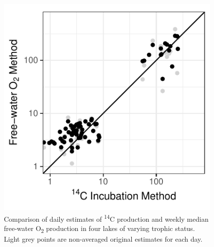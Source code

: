 \documentclass[12pt, oneside]{article}
\begin{document}
\newpage
\begin{figure}
\centering
\includegraphics{median_point.pdf}
\caption{Comparison of daily estimates of \textsuperscript{14}C production and weekly median free-water O\textsubscript{2} production in four lakes of varying trophic status. Light grey points are non-averaged original estimates for each day.}
\label{fig:medianvalues}
\end{figure}
\clearpage

\appendix
\end{document}
